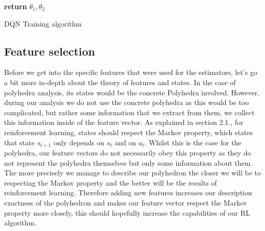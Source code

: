\begin{center}
\begin{algorithm}[H]
{{     \Indm
     \Indp{}
		\Indm
	\Indp{}\Indm
	\Indp{}
			
    }
    
   }
   \textbf{return} $\theta_1,\theta_2$
    
\caption{DQN Training algorithm}
\end{algorithm}
\end{center}



\subsection{Feature selection}
Before we get into the specific features that were used for the estimators, let's go a bit more in-depth about the theory of features and states. In the case of polyhedra analysis, its states would be the concrete Polyhedra involved. However, during our analysis we do not use the concrete polyhedra as this would be too complicated, but rather some information that we extract from them, we collect this information inside of the feature vector. As explained in section 2.1., for reinforcement learning, states should respect the Markov property, which states that state $s_{t+1}$ only depends on $s_t$ and on $a_t$. Whilst this is the case for the polyhedra, our feature vectors do not necessarily obey this property as they do not represent the polyhedra themselves but only some information about them. The more precisely we manage to describe our polyhedron the closer we will be to respecting the Markov property and the better will be the results of reinforcement learning. Therefore adding new features increases our description exactness of the polyhedron and makes our feature vector respect the Markov property more closely, this should hopefully increase the capabilities of our RL algorithm.

